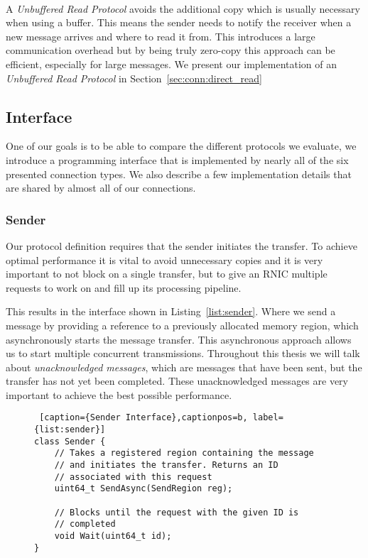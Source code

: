 \paragraph{} A \emph{Unbuffered Read Protocol} avoids the additional copy which is usually necessary when using a buffer. This means the 
sender needs to notify the receiver when a new message arrives and where to read it from.  This introduces a large
communication overhead but by being truly zero-copy this approach can be efficient, especially for large messages.
We present our implementation of an \emph{Unbuffered Read Protocol} in Section~\ref{sec:conn:direct_read}


\pagebreak
\subsection{Interface}

One of our goals is to be able to compare the different protocols we evaluate, we introduce a programming 
interface that is implemented by nearly all of the six presented connection types. We also describe a few implementation 
details that are shared by almost all of our connections.

\subsubsection{Sender}

Our protocol definition requires that the sender initiates the transfer. To achieve optimal performance it is
vital to avoid unnecessary copies and it is very important to not block on a single transfer, but to give an RNIC multiple
requests to work on and fill up its processing pipeline. 

This results in the interface shown in Listing~\ref{list:sender}. Where we send a message by providing a reference
to a previously allocated memory region, which asynchronously starts the message transfer. This asynchronous approach allows
us to start multiple concurrent transmissions. Throughout this thesis we will talk about \emph{unacknowledged messages}, which
are messages that have been sent, but the transfer has not yet been completed. These unacknowledged messages are very 
important to achieve the best possible performance.

\begin{figure}[htp]
\begin{lstlisting} [caption={Sender Interface},captionpos=b, label={list:sender}] 
class Sender {
    // Takes a registered region containing the message
    // and initiates the transfer. Returns an ID 
    // associated with this request
    uint64_t SendAsync(SendRegion reg);

    // Blocks until the request with the given ID is
    // completed
    void Wait(uint64_t id);
}
\end{lstlisting}
\end{figure}

